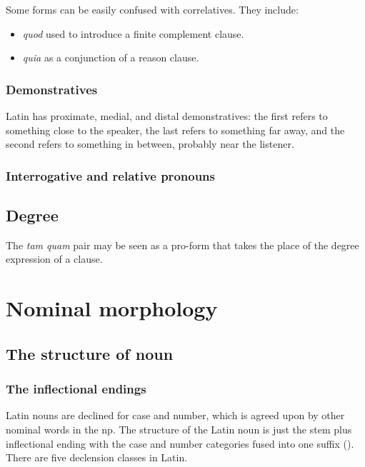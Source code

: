 \documentclass[a4paper, oneside, 12pt]{report}
\newcommand{\form}[1]{\emph{#1}}
\begin{document}
Some forms can be easily confused with correlatives.
They include:
\begin{itemize}
    \item \form{quod} used to introduce a finite complement clause.
    \item \form{quia} as a conjunction of a reason clause.
\end{itemize}

\subsection{Demonstratives}

Latin has proximate, medial, and distal demonstratives:
the first refers to something close to the speaker, 
the last refers to something far away,
and the second refers to something in between,
probably near the listener.

\subsection{Interrogative and relative pronouns}

\section{Degree}

The \form{tam quam} pair may be seen as a pro-form that takes the place of the degree expression of a clause.

\chapter{Nominal morphology}

\section{The structure of noun}\label{sec:np.noun}

\subsection{The inflectional endings}\label{sec:noun.paradigm.introduction}

Latin nouns are declined for case and number,
which is agreed upon by other nominal words in the \acs{np}.
The structure of the Latin noun is just
the stem plus inflectional ending 
with the case and number categories fused into one suffix
().
There are five declension classes in Latin.
\end{document}
